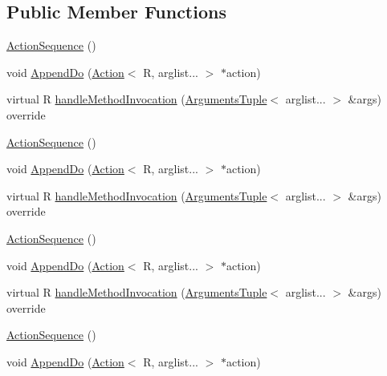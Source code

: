 \subsection*{Public Member Functions}
\begin{DoxyCompactItemize}
\item 
\mbox{\hyperlink{structfakeit_1_1ActionSequence_a2c9b1deefcce41af21f9ad4b7b431c7d}{Action\+Sequence}} ()
\item 
void \mbox{\hyperlink{structfakeit_1_1ActionSequence_a1c5ad761d28d11e6886db563e5cb39f6}{Append\+Do}} (\mbox{\hyperlink{structfakeit_1_1Action}{Action}}$<$ R, arglist... $>$ $\ast$action)
\item 
virtual R \mbox{\hyperlink{structfakeit_1_1ActionSequence_a7bc46308e2c35fe407f30045d4ce05a0}{handle\+Method\+Invocation}} (\mbox{\hyperlink{namespacefakeit_a476a37a598825e1b5dd67b3a176491a1}{Arguments\+Tuple}}$<$ arglist... $>$ \&args) override
\item 
\mbox{\hyperlink{structfakeit_1_1ActionSequence_a2c9b1deefcce41af21f9ad4b7b431c7d}{Action\+Sequence}} ()
\item 
void \mbox{\hyperlink{structfakeit_1_1ActionSequence_a1c5ad761d28d11e6886db563e5cb39f6}{Append\+Do}} (\mbox{\hyperlink{structfakeit_1_1Action}{Action}}$<$ R, arglist... $>$ $\ast$action)
\item 
virtual R \mbox{\hyperlink{structfakeit_1_1ActionSequence_a7bc46308e2c35fe407f30045d4ce05a0}{handle\+Method\+Invocation}} (\mbox{\hyperlink{namespacefakeit_a476a37a598825e1b5dd67b3a176491a1}{Arguments\+Tuple}}$<$ arglist... $>$ \&args) override
\item 
\mbox{\hyperlink{structfakeit_1_1ActionSequence_a2c9b1deefcce41af21f9ad4b7b431c7d}{Action\+Sequence}} ()
\item 
void \mbox{\hyperlink{structfakeit_1_1ActionSequence_a1c5ad761d28d11e6886db563e5cb39f6}{Append\+Do}} (\mbox{\hyperlink{structfakeit_1_1Action}{Action}}$<$ R, arglist... $>$ $\ast$action)
\item 
virtual R \mbox{\hyperlink{structfakeit_1_1ActionSequence_a7bc46308e2c35fe407f30045d4ce05a0}{handle\+Method\+Invocation}} (\mbox{\hyperlink{namespacefakeit_a476a37a598825e1b5dd67b3a176491a1}{Arguments\+Tuple}}$<$ arglist... $>$ \&args) override
\item 
\mbox{\hyperlink{structfakeit_1_1ActionSequence_a2c9b1deefcce41af21f9ad4b7b431c7d}{Action\+Sequence}} ()
\item 
void \mbox{\hyperlink{structfakeit_1_1ActionSequence_a1c5ad761d28d11e6886db563e5cb39f6}{Append\+Do}} (\mbox{\hyperlink{structfakeit_1_1Action}{Action}}$<$ R, arglist... $>$ $\ast$action)

\end{DoxyCompactItemize}
